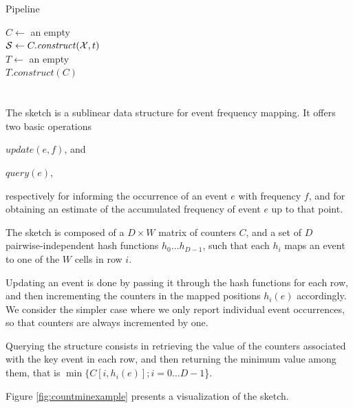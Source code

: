 \begin{algorithm}
  \caption{Pipeline}\label{alg:pipeline}
  $C \gets$ an empty \dBCM\\
  $\strsetname{S} \gets C.\mathit{construct}(\readset, t)$\\
  $T \gets$ an empty \dBHT\\
  $T.\mathit{construct}(C)$\\
\end{algorithm}

\section{\cm}
\label{sec:countmin}

The \cm sketch \cite{Cormode2005} is a sublinear data structure for event frequency mapping.
It offers two basic operations
\begin{compactenum}
\item $update(e, f)$, and
\item $query(e)$,
\end{compactenum}
respectively for informing the occurrence of an event $e$ with frequency $f$, and for obtaining an estimate of the accumulated frequency of event $e$ up to that point.

The sketch is composed of a $D\times W$ matrix of counters $C$, and a set of $D$ pairwise-independent hash functions $h_0\ldots h_{D-1}$, such that each $h_i$ maps an event to one of the $W$ cells in row $i$.


Updating an event is done by passing it through the hash functions for each row, and then incrementing the counters in
the mapped positions $h_i(e)$ accordingly. 
We consider the simpler case where we only report individual event occurrences, so that counters are always incremented by one.

Querying the structure consists in retrieving the value of the counters associated with the key event in each row,  and then returning
the minimum value among them, that is $\min\{C[i,h_i(e)]; i=0\ldots D-1$\}.


Figure \ref{fig:countminexample} presents a visualization of the \cm sketch.

